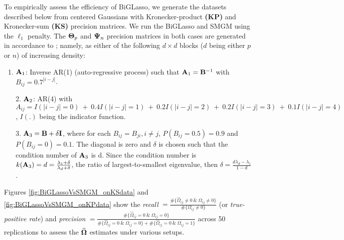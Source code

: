     To empirically assess the efficiency of BiGLasso, we generate the datasets described below from centered Gaussians with Kronecker-product \textbf{(KP)} and Kronecker-sum \textbf{(KS)} precision matrices.
    We run the BiGLasso and SMGM
    using the $\ell_1$ penalty.
    The $\mathbf{\Theta}_p$ and $\mathbf{\Psi}_n$ precision matrices in both cases are generated in accordance to \citep[\S 4,][]{Leng:Sparse12}; namely, as either of the following $d \times d$ blocks ($d$ being either $p$ or $n$) of increasing density:
    \begin{enumerate}
      \item $\mathbf{A}_1$: Inverse AR(1) (auto-regressive process) such that $\mathbf{A}_1 = \mathbf{B}^{-1}$ with $B_{ij} = 0.7^{|i-j|}$.
      \item[2.] $\mathbf{A}_2$: AR(4) with $A_{ij} = I(|i-j|=0) ~+~ 0.4I(|i-j|=1) ~+~ 0.2I(|i-j|=2) ~+~ 0.2I(|i-j|=3) ~+~ 0.1I(|i-j|=4)$, $I(.)$ being the indicator function.
      \item[3.] $\mathbf{A}_3 = \mathbf{B} + \delta\mathbf{I}$, where for each $B_{ij} = B_{ji}, i\neq j$,  $P(B_{ij}=0.5) = 0.9$ and $P(B_{ij}=0) = 0.1$.
      The diagonal is zero and $\delta$ is chosen such that the condition number of $\mathbf{A}_3$ is d.
      Since the condition number is $k(\mathbf{A}_3) = d = \frac{\lambda_1 + \delta}{\lambda_d + \delta}$, the ratio of largest-to-smallest eigenvalue, then $\delta = \frac{d \lambda_d - \lambda_1}{1 - d}$.
    \end{enumerate}
  
    Figures \ref{fig:BiGLassoVsSMGM_onKSdata} and \ref{fig:BiGLassoVsSMGM_onKPdata} show the \emph{recall} $=\frac{\# \{ \widehat{\Omega}_{ij} \neq 0 ~\&~ \Omega_{ij} \neq 0\}}{\# \{ \Omega_{ij} \neq 0 \}}$ (or \textit{true-positive rate}) and \emph{precision} $ = \frac{\# \{ \widehat{\Omega}_{ij} = 0 ~\&~ \Omega_{ij} = 0\}}{\# \{ \widehat{\Omega}_{ij} = 0 ~\&~ \Omega_{ij} = 0\} + \# \{ \widehat{\Omega}_{ij} = 0 ~\&~ \Omega_{ij} = 1\}}$ across 50 replications to assess the $\widehat{\mathbf{\Omega}}$ estimates under various setups.

